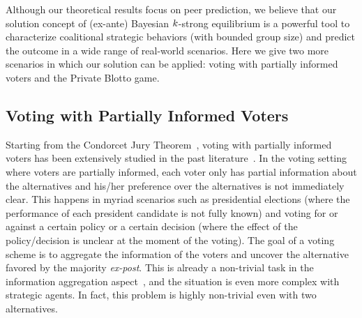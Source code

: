 Although our theoretical results focus on peer prediction, we believe that our solution concept of (ex-ante) Bayesian $k$-strong equilibrium is a powerful tool to characterize coalitional strategic behaviors (with bounded group size) and predict the outcome in a wide range of real-world scenarios. Here we give two more scenarios in which our solution can be applied: voting with partially informed voters and the Private Blotto game. 

\subsection{Voting with Partially Informed Voters}
Starting from the Condorcet Jury Theorem~\cite{Condorcet1785:Essai}, voting with partially informed voters has been extensively studied in the past literature~\cite{austen1996information,feddersen1997voting,wit1998rational, mclennan1998consequences, myerson1998extended, duggan2001bayesian, pesendorfer1996swing,feddersen1998convicting,martinelli2002convergence,gerardi2000jury,meirowitz2002informative,coughlan2000defense, han2023wisdom,acharya2016information,kim2007swing,bhattacharya2013preference, bhattacharya2023condorcet,ali2018adverse}.
In the voting setting where voters are partially informed, each voter only has partial information about the alternatives and his/her preference over the alternatives is not immediately clear.
This happens in myriad scenarios such as presidential elections (where the performance of each president candidate is not fully known) and voting for or against a certain policy or a certain decision (where the effect of the policy/decision is unclear at the moment of the voting).
The goal of a voting scheme is to aggregate the information of the voters and uncover the alternative favored by the majority  \emph{ex-post}.
This is already a non-trivial task in the information aggregation aspect~\cite{prelec2017solution}, and the situation is even more complex with strategic agents.
In fact, this problem is highly non-trivial even with two alternatives.

